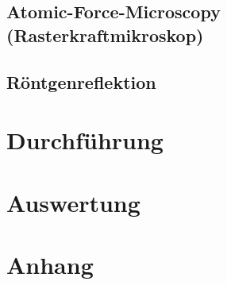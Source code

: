 \documentclass[numbers=noenddot,a4paper,notitlepage,twoside,BCOR15mm]{scrartcl}
\begin{document}
		\subsection{Atomic-Force-Microscopy (Rasterkraftmikroskop)}\label{subsec:afm}

		\subsection{Röntgenreflektion}\label{subsec:röntgen}


	\newpage
	\section{Durchführung}

	\newpage
	\section{Auswertung}

	\newpage
	\section{Anhang}

		
		
\end{document}
